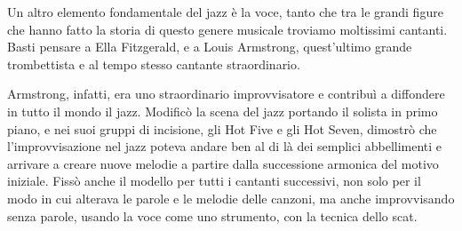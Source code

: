 Un altro elemento fondamentale del jazz è la voce, tanto che tra le grandi figure che hanno fatto la storia di questo genere musicale troviamo moltissimi cantanti. Basti pensare a Ella Fitzgerald, e a Louis Armstrong, quest’ultimo grande trombettista e al tempo stesso cantante straordinario.

Armstrong, infatti, era uno straordinario improvvisatore e contribuì a diffondere in tutto il mondo il jazz. Modificò la scena del jazz portando il solista in primo piano, e nei suoi gruppi di incisione, gli Hot Five e gli Hot Seven, dimostrò che l'improvvisazione nel jazz poteva andare ben al di là dei semplici abbellimenti e arrivare a creare nuove melodie a partire dalla successione armonica del motivo iniziale. Fissò anche il modello per tutti i cantanti successivi, non solo per il modo in cui alterava le parole e le melodie delle canzoni, ma anche improvvisando senza parole, usando la voce come uno strumento, con la tecnica dello scat.
